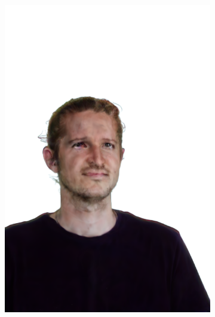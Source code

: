 \begin{figure}[ht]
\begin{subfigure}{0.08\linewidth}
        \includegraphics[width=\textwidth]{Figures/results/high/ephra_rabbit/11_render.png}

\end{subfigure}
\end{figure}
